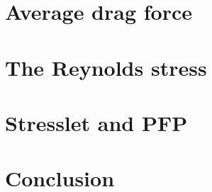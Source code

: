 \documentclass[12pt]{My_preprint}
\begin{document}









\section{Average drag force}



\section{The Reynolds stress}





%

\section{Stresslet and PFP}
%  
%  


\section{Conclusion}

\end{document}
